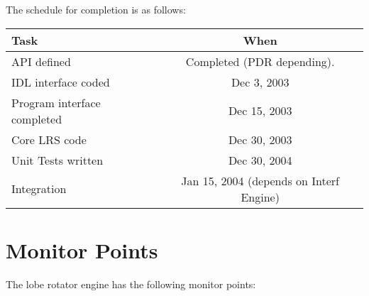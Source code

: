 \documentclass[preprint]{aastex}
\begin{document}
\bigskip
The schedule for completion is as follows:

\begin{tabular}{lc}
\hline
Task & When \\
\hline
API defined                          & Completed (PDR depending). \\
IDL interface coded                  & Dec 3, 2003 \\
Program interface completed          & Dec 15, 2003  \\
Core LRS code                        & Dec 30, 2003 \\
Unit Tests written                   & Dec 30, 2004 \\
Integration                          & Jan 15, 2004 (depends on Interf Engine)\\
\end{tabular}

\clearpage
\section{Monitor Points}
The lobe rotator engine has the following monitor points:
\end{document}
